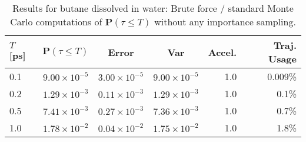 \documentclass[final]{siamltex}
\newcommand{\bP}{{\mathbf P}}
\begin{document}
\begin{table}[t]
  \caption{
    Results for butane dissolved in water: Brute force / standard Monte Carlo computations of $\bP (\tau \leq T)$ 
    without any importance sampling.}\label{tab:tmp2}
  \begin{tabular*}{0.9\textwidth}{@{\extracolsep{\fill}}lcccrr}
    \hline\hline
    $T$ [ps] & $\bP (\tau \leq T)$ & Error & Var & Accel. & Traj. Usage \\\hline
    0.1 & $9.00\times 10^{-5}$ & $3.00\times 10^{-5}$ & $9.00\times10^{-5}$ & 1.0 & 0.009\%\\
    0.2 & $1.29\times 10^{-3}$ & $0.11\times 10^{-3}$ & $1.29\times10^{-3}$ & 1.0 & 0.1\%\\
    0.5 & $7.41\times 10^{-3}$ & $0.27\times 10^{-3}$ & $7.36\times10^{-3}$ & 1.0 & 0.7\%\\
    1.0 & $1.78\times 10^{-2}$ & $0.04\times 10^{-2}$ & $1.75\times10^{-2}$ & 1.0 & 1.8\%\\
    \hline\hline
  \end{tabular*}
\end{table}
\end{document}
